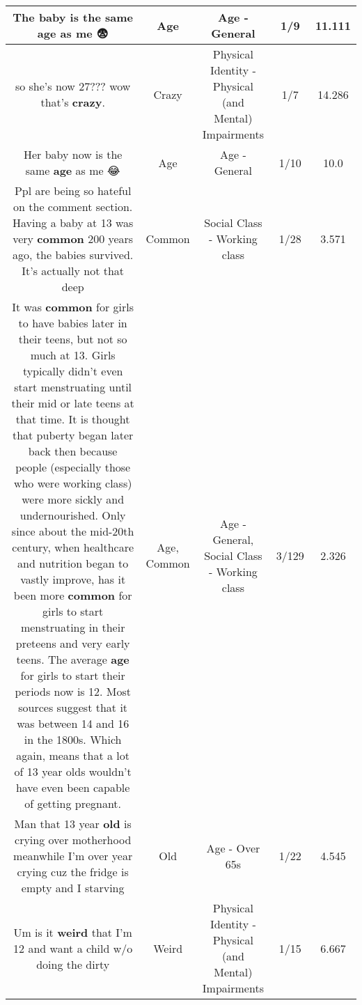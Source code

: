 \documentclass[11pt]{article}
\newlength\mylength
\begin{document}
\begin{center}
\begin{longtable}{|C{.65\mylength}|C{.30\mylength}|C{.12\mylength}|C{.12\mylength}|C{.12\mylength}|}
  \small The baby is the same \textbf{age} as me 😨\normalsize   & Age & Age - General & 1/9 & 11.111 \\  \hline
  \small so she's now 27??? wow that's \textbf{crazy}.\normalsize   & Crazy & Physical Identity - Physical (and Mental) Impairments & 1/7 & 14.286 \\  \hline
  \small Her baby now is the same \textbf{age} as me 😂\normalsize   & Age & Age - General & 1/10 & 10.0 \\  \hline
  \small Ppl are being so hateful on the comment section. Having a baby at 13 was very \textbf{common} 200 years ago, the babies survived. It's actually not that deep\normalsize   & Common & Social Class - Working class & 1/28 & 3.571 \\  \hline
  \small It was \textbf{common} for girls to have babies later in their teens, but not so much at 13. Girls typically didn't even start menstruating until their mid or late teens at that time. It is thought that puberty began later back then because people (especially those who were working class) were more sickly and undernourished. Only since about the mid-20th century, when healthcare and nutrition began to vastly improve, has it been more \textbf{common} for girls to start menstruating in their preteens and very early teens. The average \textbf{age} for girls to start their periods now is 12. Most sources suggest that it was between 14 and 16 in the 1800s. Which again, means that a lot of 13 year olds wouldn't have even been capable of getting pregnant.\normalsize   & Age, Common & Age - General, Social Class - Working class & 3/129 & 2.326 \\  \hline
  \small Man that 13 year \textbf{old} is crying over motherhood meanwhile I'm over year crying cuz the fridge is empty and I starving\normalsize   & Old & Age - Over 65s & 1/22 & 4.545 \\  \hline
  \small Um is it \textbf{weird} that I'm 12 and want a child w/o doing the dirty\normalsize   & Weird & Physical Identity - Physical (and Mental) Impairments & 1/15 & 6.667 \\  \hline

\end{longtable}
\end{center}
\end{document}
